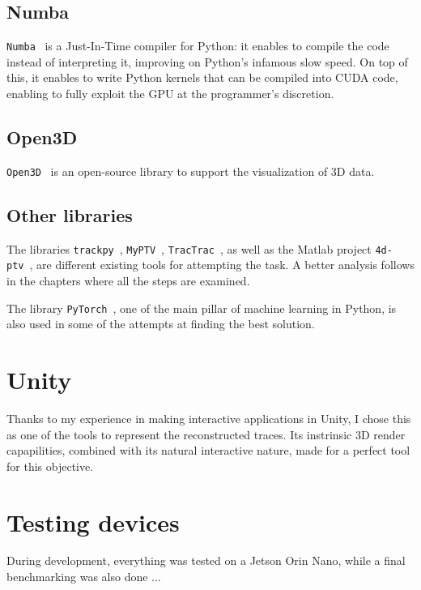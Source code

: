 \subsection{Numba}

\texttt{Numba}~\cite{numba} is a Just-In-Time compiler for Python: it enables to compile the code instead of interpreting it, improving on Python's infamous slow speed.
On top of this, it enables to write Python kernels that can be compiled into CUDA code, enabling to fully exploit the GPU at the programmer's discretion.

\subsection{Open3D}

\texttt{Open3D}~\cite{open3d} is an open-source library to support the visualization of 3D data.

\subsection{Other libraries}

The libraries \texttt{trackpy}~\cite{trackpy}, \texttt{MyPTV}~\cite{myptv}, \texttt{TracTrac}~\cite{tractrac}, as well as the Matlab project \texttt{4d-ptv}~\cite{fourdptv}, are different existing tools for attempting the task. A better analysis follows in the chapters where all the steps are examined.

The library \texttt{PyTorch}~\cite{pytorch}, one of the main pillar of machine learning in Python, is also used in some of the attempts at finding the best solution.

\section{Unity}

Thanks to my experience in making interactive applications in Unity, I chose this as one of the tools to represent the reconstructed traces.
Its instrinsic 3D render capapilities, combined with its natural interactive nature, made for a perfect tool for this objective.

\section{Testing devices}

During development, everything was tested on a Jetson Orin Nano, while a final benchmarking was also done ...

